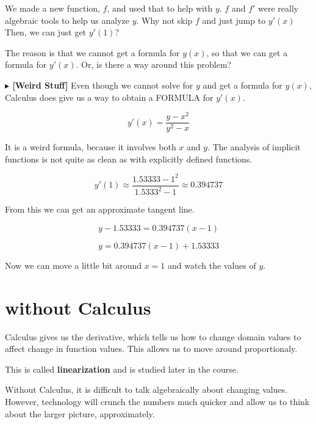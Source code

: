 \documentclass{ximera}
\begin{document}
We made a new function, $f$, and used that to help with $y$.  $f$ and $f'$ were really algebraic tools to help us analyze $y$. Why not skip $f$ and just jump to $y'(x)$  Then, we can just get $y'(1)$?

The reason is that we cannot get a formula for $y(x)$, so that we can get a formula for $y'(x)$. Or, is there a way around this problem?



\textbf{\textcolor{red!80!black}{$\blacktriangleright$  [Weird Stuff]}}  Even though we cannot solve for $y$ and get a formula for $y(x)$, Calculus does give us a way to obtain a FORMULA for $y'(x)$.



\[
y'(x) = \frac{y - x^2}{y^2 - x}
\]


It is a weird formula, because it involves both $x$ and $y$.  The analysis of implicit functions is not quite as clean as with explicitly defined functions.


\[
y'(1) \approx \frac{1.53333 - 1^2}{1.5333^2 - 1} \approx 0.394737
\]



From this we can get an approximate tangent line.

\[
y - 1.53333 = 0.394737(x-1)
\]


\[
y = 0.394737(x-1) + 1.53333
\]


Now we can move a little bit around $x=1$ and watch the values of $y$.



\begin{center}
\end{center}






\section*{without Calculus}



Calculus gives us the derivative, which tells us how to change domain values to affect change in function values.  This allows us to move around proportionaly.  

This is called \textbf{linearization} and is studied later in the course.

Without Calculus, it is difficult to talk algebraically about changing values.  However, technology will crunch the numbers much quicker and allow us to think about the larger picture, approximately.
\end{document}

